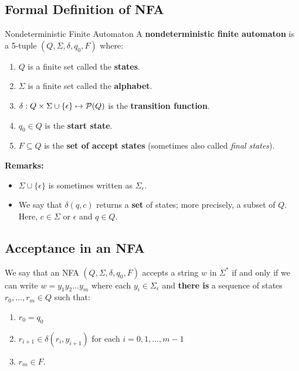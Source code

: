 \documentclass[letterpaper]{article}
\begin{document}
\subsection{Formal Definition of NFA}
\begin{definition}{Nondeterministic Finite Automaton}{}
    A \textbf{nondeterministic finite automaton} is a 5-tuple $(Q, \Sigma, \delta, q_0, F)$ where: 
    \begin{enumerate}
        \item $Q$ is a finite set called the \textbf{states}.
        \item $\Sigma$ is a finite set called the \textbf{alphabet}.
        \item $\delta: Q \times \Sigma \cup \{\epsilon\} \mapsto \mathcal{P}(Q)$ is the \textbf{transition function}.
        \item $q_0 \in Q$ is the \textbf{start state}.
        \item $F \subseteq Q$ is the \textbf{set of accept states} (sometimes also called \emph{final states}).
    \end{enumerate}
\end{definition}
\textbf{Remarks:}
\begin{itemize}
    \item $\Sigma \cup \{\epsilon\}$ is sometimes written as $\Sigma_{\epsilon}$.
    \item We say that $\delta(q, c)$ returns a \textbf{set} of states; more precisely, a subset of $Q$. Here, $c \in \Sigma$ or $\epsilon$ and $q \in Q$.
\end{itemize}

\subsection{Acceptance in an NFA}
We say that an NFA $(Q, \Sigma, \delta, q_0, F)$ accepts a string $w$ in $\Sigma^*$ if and only if we can write $w = y_1 y_2 \dots y_m$ where each $y_i \in \Sigma_{\epsilon}$ and \textbf{there is} a sequence of states $r_0, \dots, r_m \in Q$ such that: 
\begin{enumerate}
    \item $r_0 = q_0$
    \item $r_{i + 1} \in \delta(r_i, y_{i + 1})$ for each $i = 0, 1, \dots, m - 1$
    \item $r_m \in F$.
\end{enumerate}
\end{document}
